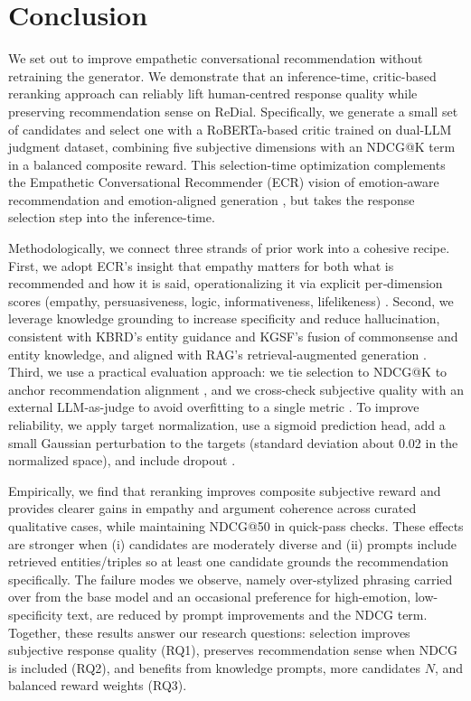 \documentclass[12pt]{article}
\begin{document}
  \section{Conclusion}
  We set out to improve empathetic conversational recommendation without retraining the generator. We demonstrate that an inference-time, critic-based reranking approach can reliably lift human-centred response quality while preserving recommendation sense on ReDial. Specifically, we generate a small set of candidates and select one with a RoBERTa-based critic trained on dual‑LLM judgment dataset, combining five subjective dimensions with an NDCG@K term in a balanced composite reward. This selection-time optimization complements the Empathetic Conversational Recommender (ECR) vision of emotion‑aware recommendation and emotion‑aligned generation \citep{zhang2024ecr}, but takes the response selection step into the inference-time.
  
  Methodologically, we connect three strands of prior work into a cohesive recipe. First, we adopt ECR's insight that empathy matters for both what is recommended and how it is said, operationalizing it via explicit per‑dimension scores (empathy, persuasiveness, logic, informativeness, lifelikeness) \citep{zhang2024ecr}. Second, we leverage knowledge grounding to increase specificity and reduce hallucination, consistent with KBRD's entity guidance and KGSF's fusion of commonsense and entity knowledge, and aligned with RAG's retrieval‑augmented generation \citep{chen2020kbrd,zhou2020kgsf,speer2017conceptnet,dbpedia_wikipedia,lewis2020rag}. Third, we use a practical evaluation approach: we tie selection to NDCG@K to anchor recommendation alignment \citep{evidently_ndcg}, and we cross-check subjective quality with an external LLM-as-judge to avoid overfitting to a single metric \citep{yan2023llmjudge}. To improve reliability, we apply target normalization, use a sigmoid prediction head, add a small Gaussian perturbation to the targets (standard deviation about 0.02 in the normalized space), and include dropout \citep{muller2019label_smoothing,srivastava2014dropout}.
  
  Empirically, we find that reranking improves composite subjective reward and provides clearer gains in empathy and argument coherence across curated qualitative cases, while maintaining NDCG@50 in quick‑pass checks. These effects are stronger when (i) candidates are moderately diverse and (ii) prompts include retrieved entities/triples so at least one candidate grounds the recommendation specifically. The failure modes we observe, namely over-stylized phrasing carried over from the base model and an occasional preference for high-emotion, low-specificity text, are reduced by prompt improvements and the NDCG term. Together, these results answer our research questions: selection improves subjective response quality (RQ1), preserves recommendation sense when NDCG is included (RQ2), and benefits from knowledge prompts, more candidates $N$, and balanced reward weights (RQ3).
  
\end{document}

